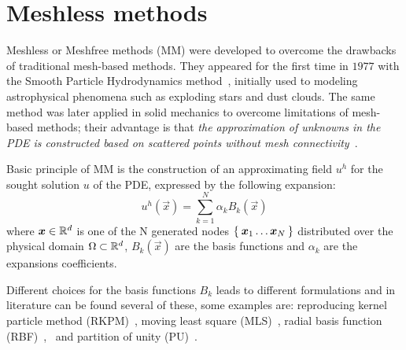 \chapter{Meshless methods}\label{chap:lorem}

Meshless or Meshfree methods (MM) were developed to overcome the drawbacks of traditional mesh-based methods.
They appeared for the first time in $1977$ with the Smooth Particle Hydrodynamics method~\cite{Belytschko:meshless_overview}, initially used to modeling astrophysical phenomena such as exploding stars and dust clouds. The same method was later applied in solid mechanics to overcome limitations of mesh-based methods; their advantage is that \textit{the approximation of unknowns in the PDE is constructed based on scattered points without mesh connectivity}~\cite{Chen:meshless_overview_after_20_years}.

Basic principle of MM is the construction of an approximating field $u^{h}$ for the sought solution $u $ of the PDE, expressed by the following expansion:
\begin{equation}
	\label{eqn:general_u_discretization}
	u^{h}(\vec{x}) = \sum_{k= 1}^{N} {\alpha_k B_k(\vec{x})}
\end{equation}
where $\boldsymbol{x} \in \mathbb{R}^{d}$ is one of the N generated nodes $\Set{\boldsymbol{x}_1 \dots \boldsymbol{x}_N}$ distributed over the physical domain $\Omega \subset \mathbb{R}^{d}$, $B_k(\vec{x})$ are the basis functions and $\alpha_k$ are the expansions coefficients.

Different choices for the basis functions $B_k$ leads to different formulations and in literature can be found several of these, some examples are:  reproducing kernel particle method (RKPM)~\cite{Liu:RKPM}, moving least square (MLS)~\cite{Lancaster:MLS}, radial basis function (RBF)~\cite{Kansa:RBF_1},~\cite{Kansa:RBF_2} and partition of unity (PU)~\cite{Schweitzer:PU}.

